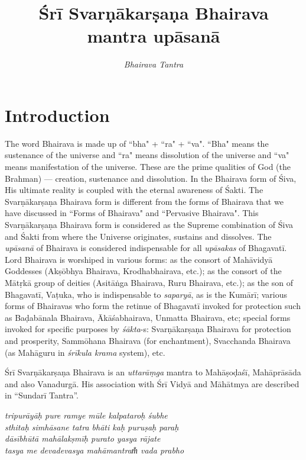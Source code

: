 \documentclass[12pt,oneside,a4paper]{article}
\title{\textbf{Śrī Svarṇākarṣaṇa Bhairava\\ mantra upāsanā}}
\author{\textit{Bhairava Tantra}}
\date{\relax}
\newenvironment{shloka}[1]
  {\bigskip\center#1\varwidth{\linewidth}}
  {\endvarwidth\endcenter\bigskip}
\newcommand{\tl}[1]{\emph{#1}}
\begin{document}
\maketitle
\tableofcontents
\clearpage

{}
\section*{Introduction}

The word Bhairava is made up of ``bha" + ``ra" + ``va". ``Bha" means
the sustenance of the universe and ``ra" means dissolution of the universe
and ``va" means manifestation of the universe. These are the prime qualities
of God (the Brahman) — creation, sustenance and dissolution. In the Bhairava
form of Śiva, His ultimate reality is coupled with the eternal awareness
of Śakti. The Svarṇākarṣaṇa Bhairava form is different from the forms of
Bhairava that we have discussed in ``Forms of Bhairava" and ``Pervasive
Bhairava". This Svarṇākarṣaṇa Bhairava form is considered as the Supreme
combination of Śiva and Śakti from where the Universe originates, sustains and
dissolves. The \tl{upāsanā} of Bhairava is considered indispensable for all
\tl{upāsakas} of Bhagavatī. Lord Bhairava is worshiped in various forms: as
the consort of Mahāvidyā Goddesses (Akṣōbhya Bhairava, Krodhabhairava, etc.);
as the consort of the Mātṛkā group of deities (Asitāṅga Bhairava, Ruru Bhairava,
etc.); as the son of Bhagavatī, Vaṭuka, who is indispensable to \tl{saparyā},
as is the Kumārī; various forms of Bhairavas who form the retinue of Bhagavatī
invoked for protection such as Baḍabānala Bhairava, Ākāśabhairava, Unmatta
Bhairava, etc; special forms invoked for specific purposes by \tl{śākta}-s:
Svarṇākarṣaṇa Bhairava for protection and prosperity, Sammōhana Bhairava (for
enchantment), Svacchanda Bhairava (as Mahāguru in \tl{śrīkula krama} system),
etc.

Śrī Svarṇākarṣaṇa Bhairava is an \tl{uttarāṃga} mantra to Mahāṣoḍaśī,
Mahāprāsāda and also Vanadurgā. His association with Śrī Vidyā and Māhātmya
are described in ``Sundarī Tantra''.

\begin{shloka}\itshape
  tripurāyāḥ pure ramye mūle kalpataroḥ śubhe \\
  sthitaḥ simhāsane tatra bhāti kaḥ puruṣaḥ paraḥ \\
  dāsībhūtā mahālakṣmīḥ purato yasya rājate \\
  tasya me devadevasya mahāmantram̐ vada prabho
\end{shloka}
\end{document}
